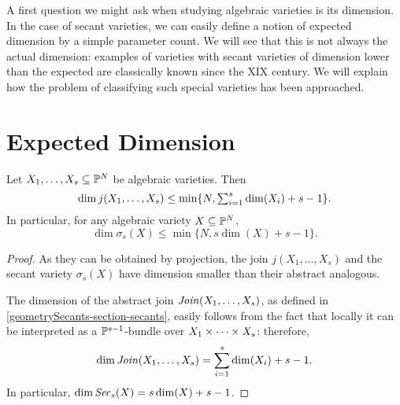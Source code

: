 
A first question we might ask when studying algebraic varieties is its dimension. In the case of secant varieties, we can easily define a notion of expected dimension by a simple parameter count. We will see that this is not always the actual dimension: examples of varieties with secant varieties of dimension lower than the expected are classically known since the XIX century. We will explain how the problem of classifying such special varieties has been approached. 

\section{Expected Dimension}
\label{geometrySecants-section-expectedDimension}

\begin{lemma}
\label{geometrySecants-lemma-expecteddimension}
Let $X_1, \ldots , X_s \subseteq \mathbb{P}^N$ be algebraic varieties. Then 
\[
    \dim j(X_1, \ldots , X_s) \leq \min\{ N, \textstyle\sum_{i=1}^s \dim(X_i) + s-1\}.
\]
In particular, for any algebraic variety $X \subseteq \mathbb{P}^N$,  
\[
    \dim \sigma_s(X) \leq \min\{ N , s\dim(X) + s - 1\}.
\]
\begin{proof}
As they can be obtained by projection, the join $j(X_1,\ldots,X_s)$ and the secant variety $\sigma_s(X)$ have dimension smaller than their abstract analogous.

The dimension of the abstract join $\mathit{Join}(X_1,\ldots,X_s)$, as defined in \ref{geometrySecants-section-secants}, easily follows from the fact that locally it can be interpreted as a $\mathbb{P}^{s-1}$-bundle over $X_1 \times \cdots \times X_s$: therefore, 
    \[
        \dim \mathit{Join}(X_1,\ldots,X_s) = \sum_{i=1}^s \dim(X_i) + s-1.
    \]
    In particular, $\dim \mathit{Sec}_s(X) = s\dim(X) + s-1$.
\end{proof}
\end{lemma}


